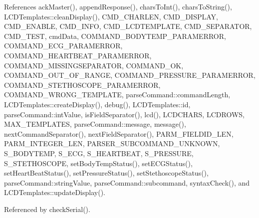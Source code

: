 References ack\-Master(), append\-Response(), chars\-To\-Int(), chars\-To\-String(), L\-C\-D\-Templates\-::clean\-Display(), C\-M\-D\-\_\-\-C\-H\-A\-R\-L\-E\-N, C\-M\-D\-\_\-\-D\-I\-S\-P\-L\-A\-Y, C\-M\-D\-\_\-\-E\-N\-A\-B\-L\-E, C\-M\-D\-\_\-\-I\-N\-F\-O, C\-M\-D\-\_\-\-L\-C\-D\-T\-E\-M\-P\-L\-A\-T\-E, C\-M\-D\-\_\-\-S\-E\-P\-A\-R\-A\-T\-O\-R, C\-M\-D\-\_\-\-T\-E\-S\-T, cmd\-Data, C\-O\-M\-M\-A\-N\-D\-\_\-\-B\-O\-D\-Y\-T\-E\-M\-P\-\_\-\-P\-A\-R\-A\-M\-E\-R\-R\-O\-R, C\-O\-M\-M\-A\-N\-D\-\_\-\-E\-C\-G\-\_\-\-P\-A\-R\-A\-M\-E\-R\-R\-O\-R, C\-O\-M\-M\-A\-N\-D\-\_\-\-H\-E\-A\-R\-T\-B\-E\-A\-T\-\_\-\-P\-A\-R\-A\-M\-E\-R\-R\-O\-R, C\-O\-M\-M\-A\-N\-D\-\_\-\-M\-I\-S\-S\-I\-N\-G\-S\-E\-P\-A\-R\-A\-T\-O\-R, C\-O\-M\-M\-A\-N\-D\-\_\-\-O\-K, C\-O\-M\-M\-A\-N\-D\-\_\-\-O\-U\-T\-\_\-\-O\-F\-\_\-\-R\-A\-N\-G\-E, C\-O\-M\-M\-A\-N\-D\-\_\-\-P\-R\-E\-S\-S\-U\-R\-E\-\_\-\-P\-A\-R\-A\-M\-E\-R\-R\-O\-R, C\-O\-M\-M\-A\-N\-D\-\_\-\-S\-T\-E\-T\-H\-O\-S\-C\-O\-P\-E\-\_\-\-P\-A\-R\-A\-M\-E\-R\-R\-O\-R, C\-O\-M\-M\-A\-N\-D\-\_\-\-W\-R\-O\-N\-G\-\_\-\-T\-E\-M\-P\-L\-A\-T\-E, parse\-Command\-::command\-Length, L\-C\-D\-Templates\-::create\-Display(), debug(), L\-C\-D\-Templates\-::id, parse\-Command\-::int\-Value, is\-Field\-Separator(), lcd(), L\-C\-D\-C\-H\-A\-R\-S, L\-C\-D\-R\-O\-W\-S, M\-A\-X\-\_\-\-T\-E\-M\-P\-L\-A\-T\-E\-S, parse\-Command\-::message, message(), next\-Command\-Separator(), next\-Field\-Separator(), P\-A\-R\-M\-\_\-\-F\-I\-E\-L\-D\-I\-D\-\_\-\-L\-E\-N, P\-A\-R\-M\-\_\-\-I\-N\-T\-E\-G\-E\-R\-\_\-\-L\-E\-N, P\-A\-R\-S\-E\-R\-\_\-\-S\-U\-B\-C\-O\-M\-M\-A\-N\-D\-\_\-\-U\-N\-K\-N\-O\-W\-N, S\-\_\-\-B\-O\-D\-Y\-T\-E\-M\-P, S\-\_\-\-E\-C\-G, S\-\_\-\-H\-E\-A\-R\-T\-B\-E\-A\-T, S\-\_\-\-P\-R\-E\-S\-S\-U\-R\-E, S\-\_\-\-S\-T\-E\-T\-H\-O\-S\-C\-O\-P\-E, set\-Body\-Temp\-Status(), set\-E\-C\-G\-Status(), set\-Heart\-Beat\-Status(), set\-Pressure\-Status(), set\-Stethoscope\-Status(), parse\-Command\-::string\-Value, parse\-Command\-::subcommand, syntax\-Check(), and L\-C\-D\-Templates\-::update\-Display().



Referenced by check\-Serial().



